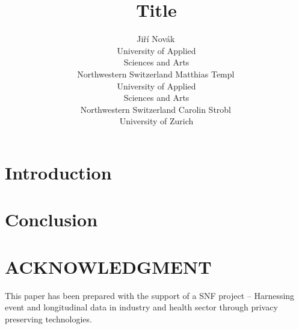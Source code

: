 \documentclass[article]{ajs}
\author{
		Jiří Novák\,\orcidlink{0000-0003-0715-4769}\\ University of Applied \\ Sciences and Arts \\ Northwestern Switzerland \And 
		Matthias Templ\,\orcidlink{0000-0002-8638-5276}\\ University of Applied \\ Sciences and Arts \\ Northwestern Switzerland \And 
        Carolin Strobl\,\orcidlink{0000-0003-0952-3230}\\ University of Zurich
        }
\title{Title}
\begin{document}
\section{Introduction}



\section{Conclusion}


\section{ACKNOWLEDGMENT}

This paper has been prepared with the support of a SNF project – Harnessing event and longitudinal data in industry and health sector through privacy preserving technologies. 


%

\end{document}
